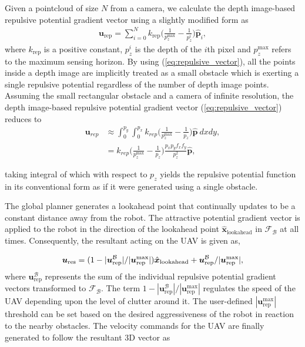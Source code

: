 \documentclass[letterpaper, 10 pt, conference]{ieeeconf}  %
\newcommand{\rep}{\text{rep}}
\begin{document}
Given a pointcloud of size $N$ from a camera, we calculate the depth image-based repulsive potential gradient vector using a slightly modified form as
\begin{align}
    \label{eq:repulsive_vector}
    \bm{u}_{\rep} = \sum \limits_{i=0}^N  k_{\rep} \bigg(\frac{1}{p_z^{\max}} - \frac{1}{p_z^i}\bigg) \hat{\bm{p}}_i,
\end{align}
where $k_{\rep}$ is a positive constant, $p_z^i$ is the depth of the $i$th pixel and $p_z^{\max}$ refers to the maximum sensing horizon. By using (\ref{eq:repulsive_vector}), all the points inside a depth image are implicitly treated as a small obstacle which is exerting a single repulsive potential regardless of the number of depth image points. Assuming the small rectangular obstacle and a camera of infinite resolution, the depth image-based repulsive potential gradient vector (\ref{eq:repulsive_vector}) reduces to
\begin{align}
    \label{eq:repulsive_vec_approx}
    \bm{u}_{rep} &\approx \int_0^{p_y} \int_0^{p_x} k_{rep} \bigg(\frac{1}{p_z^{\max}} - \frac{1}{p_z}\bigg) \hat{\bm{p}} \: dxdy, \nonumber \\
    &= k_{rep} \bigg(\frac{1}{p_z^{\max}} - \frac{1}{p_z}\bigg) \frac{p_xp_yf_xf_y}{p_z^2} \hat{\bm{p}},
\end{align}

taking integral of which with respect to $p_z$ yields the repulsive potential function in its conventional form \cite{khatib1986real} as if it were generated using a single obstacle. \par

The global planner generates a lookahead point that continually updates to be a constant distance away from the robot. The attractive potential gradient vector is applied to the robot in the direction of the lookahead point $\hat{\bm{x}}_{\text{lookahead}}$ in $\mathcal{F}_\mathcal{B}$ at all times. Consequently, the resultant acting on the UAV is given as,

\begin{align}
    \label{eq:resultant_vec}
    \bm{u}_{\text{res}} = (1-|\bm{u}_{\text{rep}}^\mathcal{B}|/|\bm{u}_{\text{rep}}^{\max}|) \hat{\bm{x}}_{\text{lookahead}} + \bm{u}_{\text{\text{rep}}}^\mathcal{B}/|\bm{u}_{\text{\text{rep}}}^{\max}|,
\end{align}
where $\bm{u}_{\text{rep}}^\mathcal{B}$ represents the sum of the individual repulsive potential gradient vectors transformed to $\mathcal{F}_\mathcal{B}$. The term $1-|\bm{u}_{\text{rep}}^\mathcal{B}|/|\bm{u}_{\text{rep}}^{\max}|$ regulates the speed of the UAV depending upon the level of clutter around it. The user-defined $|\bm{u}_{\text{rep}}^{\max}|$ threshold can be set based on the desired aggressiveness of the robot in reaction to the nearby obstacles. The velocity commands for the UAV are finally generated to follow the resultant 3D vector as
\end{document}
